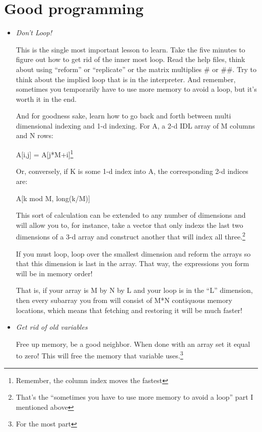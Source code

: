 \section{Good programming}\label{sec:qs-good-programming}

\begin{itemize}
  \item \textit{Don't Loop!}

   This is the single most important lesson to learn. Take the five
  minutes to figure out how to get rid of the inner most loop. Read
  the help files, think about using ``reform'' or ``replicate'' or the
  matrix multiplies \# or \#\#. Try to think about the implied loop
  that is in the interpreter. And remember, sometimes you temporarily
  have to use more memory to avoid a loop, but it's worth it in the
  end.

  And for goodness sake, learn how to go back and forth between multi
  dimensional indexing and 1-d indexing.  For A, a 2-d IDL array of M columns
  and N rows:

  A[i,j] = A[j*M+i]\footnote{Remember, the column index moves the
  fastest}

  Or, conversely, if K is some 1-d index into A, the corresponding 2-d
  indices are:

  A[k mod M, long(k/M)] 

  
  This sort of calculation can be extended to any number of dimensions
  and will allow you to, for instance, take a  vector
  that only indexs the last two dimensions of a 3-d array and
  construct another that will index all three.\footnote{That's the
  ``sometimes you have to use more  memory to avoid a loop'' part I
  mentioned above}


   If you must loop, loop over the smallest dimension and reform the
   arrays so that this dimension is last in the array. That way, the
   expressions you form will be in memory order!

   That is, if your array is M by N by L and your loop is in the ``L''
   dimension, then every subarray you from will consist of M*N
   contiquous memory locations, which means that fetching and
   restoring it will be much faster!

  \item \textit{Get rid of old variables}

    Free up memory, be a good neighbor. When done with an array set
  it equal to zero! This will free the memory that variable
  uses.\footnote{For the most part}



\end{itemize}
